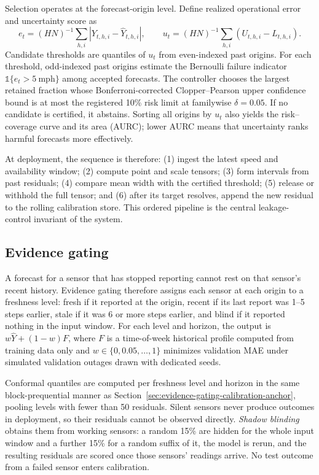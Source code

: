 \documentclass[preprint,12pt]{elsarticle}
\begin{document}
Selection operates at the forecast-origin level. Define realized operational
error and uncertainty score as
\begin{equation}
 e_t=(HN)^{-1}\sum_{h,i}|Y_{t,h,i}-\hat Y_{t,h,i}|,
 \qquad
 u_t=(HN)^{-1}\sum_{h,i}(U_{t,h,i}-L_{t,h,i}).
\end{equation}
Candidate thresholds are quantiles of $u_t$ from even-indexed past origins.
For each threshold, odd-indexed past origins estimate the Bernoulli failure
indicator $\mathbb{1}\{e_t>5\ \mathrm{mph}\}$ among accepted forecasts. The
controller chooses the largest retained fraction whose Bonferroni-corrected
Clopper--Pearson upper confidence bound is at most the registered 10\% risk
limit at familywise $\delta=0.05$. If no candidate is certified, it abstains.
Sorting all origins by $u_t$ also yields the risk--coverage curve and its area
(AURC); lower AURC means that uncertainty ranks harmful forecasts more
effectively.

At deployment, the sequence is therefore: (1) ingest the latest speed and
availability window; (2) compute point and scale tensors; (3) form intervals
from past residuals; (4) compare mean width with the certified threshold; (5)
release or withhold the full tensor; and (6) after its target resolves, append
the new residual to the rolling calibration store. This ordered pipeline is the
central leakage-control invariant of the system.

\subsection{Evidence gating}
\label{sec:evidence-gating}
A forecast for a sensor that has stopped reporting cannot rest on that sensor's
recent history. Evidence gating therefore assigns each sensor at each origin to a
freshness level: fresh if it reported at the origin, recent if its last report
was 1--5 steps earlier, stale if it was 6 or more steps earlier, and blind if it
reported nothing in the input window. For each level and horizon, the output is
$w\widehat{Y}+(1-w)F$, where $F$ is a time-of-week historical profile computed
from training data only and $w\in\{0,0.05,\dots,1\}$ minimizes validation MAE
under simulated validation outages drawn with dedicated seeds.

Conformal quantiles are computed per freshness level and horizon in the same
block-prequential manner as Section~\ref{sec:evidence-gating-calibration-anchor},
pooling levels with fewer than 50 residuals. Silent sensors never produce
outcomes in deployment, so their residuals cannot be observed directly.
\emph{Shadow blinding} obtains them from working sensors: a random 15\% are
hidden for the whole input window and a further 15\% for a random suffix of it,
the model is rerun, and the resulting residuals are scored once those sensors'
readings arrive. No test outcome from a failed sensor enters calibration.
\end{document}
